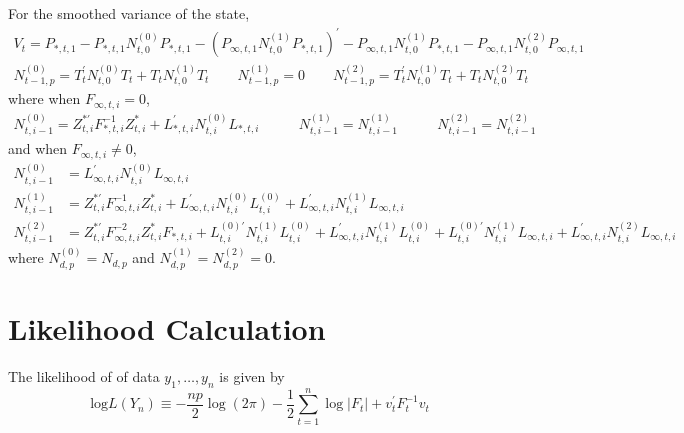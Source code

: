\documentclass[12pt]{article}
\newcommand{\Cov}[0]{\text{Cov}}
\newcommand{\Var}[0]{\text{Var}}
\newcommand{\flag}[0]{red}
\begin{document}
	For the smoothed variance of the state, 
	\begin{align*}
	V_t = P_{*,t,1} - P_{*,t,1} N_{t,0}^{(0)} P_{*,t,1} - \left(P_{\infty,t,1} N_{t,0}^{(1)} P_{*,t,1} \right)^\prime - P_{\infty,t,1} N_{t,0}^{(1)} P_{*,t,1} - P_{\infty,t,1} N_{t,0}^{(2)} P_{\infty,t,1} \\
	N_{t-1,p}^{(0)} = T_t^\prime N_{t,0}^{(0)} T_t + T_t N_{t,0}^{(1)} T_t \qquad
	N_{t-1,p}^{(1)} = 0 \qquad
	N_{t-1,p}^{(2)} = T_t^\prime N_{t,0}^{(1)} T_t + T_t N_{t,0}^{(2)} T_t
	\end{align*}
	where when $F_{\infty,t,i} = 0$, 
	\begin{align*}
	N_{t,i-1}^{(0)} = Z_{t,i}^{*\prime} F_{*,t,i}^{-1} Z_{t,i}^* + L_{*,t,i}^\prime N_{t,i}^{(0)} L_{*,t,i} &\qquad
	N_{t,i-1}^{(1)} = N_{t,i-1}^{(1)} &\qquad
	N_{t,i-1}^{(2)} = N_{t,i-1}^{(2)} 
	\end{align*}
	and when $F_{\infty,t,i} \neq 0$,
	\begin{align*}
	N_{t,i-1}^{(0)} &= L_{\infty,t,i}^\prime N_{t,i}^{(0)} L_{\infty,t,i}\\
	N_{t,i-1}^{(1)} &= Z_{t,i}^{*\prime} F_{\infty,t,i}^{-1} Z_{t,i}^* + L_{\infty,t,i}^\prime N_{t,i}^{(0)} L_{t,i}^{(0)} + L_{\infty,t,i}^\prime N_{t,i}^{(1)} L_{\infty,t,i}  \\
	N_{t,i-1}^{(2)} &= Z_{t,i}^{*\prime} F_{\infty,t,i}^{-2} Z_{t,i}^* F_{*,t,i} + L_{t,i}^{(0)\prime} N_{t,i}^{(1)} L_{t,i}^{(0)} + L_{\infty,t,i}^\prime N_{t,i}^{(1)} L_{t,i}^{(0)} + L_{t,i}^{(0)\prime} N_{t,i}^{(1)} L_{\infty,t,i} + L_{\infty,t,i}^\prime N_{t,i}^{(2)} L_{\infty,t,i}
	\end{align*}
	where $N_{d,p}^{(0)} = N_{d,p}$ and $N_{d,p}^{(1)} = N_{d,p}^{(2)} = 0$. \\



\newpage
\section*{Likelihood Calculation}
	The likelihood of of data $y_1, \dots, y_n$ is given by
	\begin{equation*} 
	\text{log} L(Y_n) \equiv -\frac{np}{2} \log(2\pi) - \frac{1}{2}  \sum_{t=1}^n \log|F_t| + v_t^\prime F_t^{-1}v_t
	\end{equation*}
\end{document}
